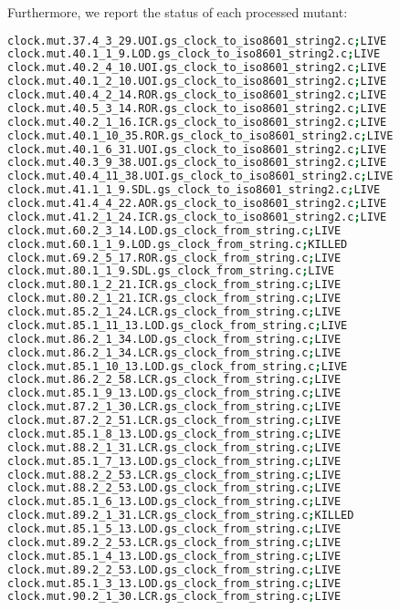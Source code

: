 
Furthermore, we report the status of each processed mutant:

\begin{lstlisting}[language=bash, label=statuses, caption=Mutants statuses.]
clock.mut.37.4_3_29.UOI.gs_clock_to_iso8601_string2.c;LIVE
clock.mut.40.1_1_9.LOD.gs_clock_to_iso8601_string2.c;LIVE
clock.mut.40.2_4_10.UOI.gs_clock_to_iso8601_string2.c;LIVE
clock.mut.40.1_2_10.UOI.gs_clock_to_iso8601_string2.c;LIVE
clock.mut.40.4_2_14.ROR.gs_clock_to_iso8601_string2.c;LIVE
clock.mut.40.5_3_14.ROR.gs_clock_to_iso8601_string2.c;LIVE
clock.mut.40.2_1_16.ICR.gs_clock_to_iso8601_string2.c;LIVE
clock.mut.40.1_10_35.ROR.gs_clock_to_iso8601_string2.c;LIVE
clock.mut.40.1_6_31.UOI.gs_clock_to_iso8601_string2.c;LIVE
clock.mut.40.3_9_38.UOI.gs_clock_to_iso8601_string2.c;LIVE
clock.mut.40.4_11_38.UOI.gs_clock_to_iso8601_string2.c;LIVE
clock.mut.41.1_1_9.SDL.gs_clock_to_iso8601_string2.c;LIVE
clock.mut.41.4_4_22.AOR.gs_clock_to_iso8601_string2.c;LIVE
clock.mut.41.2_1_24.ICR.gs_clock_to_iso8601_string2.c;LIVE
clock.mut.60.2_3_14.LOD.gs_clock_from_string.c;LIVE
clock.mut.60.1_1_9.LOD.gs_clock_from_string.c;KILLED
clock.mut.69.2_5_17.ROR.gs_clock_from_string.c;LIVE
clock.mut.80.1_1_9.SDL.gs_clock_from_string.c;LIVE
clock.mut.80.1_2_21.ICR.gs_clock_from_string.c;LIVE
clock.mut.80.2_1_21.ICR.gs_clock_from_string.c;LIVE
clock.mut.85.2_1_24.LCR.gs_clock_from_string.c;LIVE
clock.mut.85.1_11_13.LOD.gs_clock_from_string.c;LIVE
clock.mut.86.2_1_34.LOD.gs_clock_from_string.c;LIVE
clock.mut.86.2_1_34.LCR.gs_clock_from_string.c;LIVE
clock.mut.85.1_10_13.LOD.gs_clock_from_string.c;LIVE
clock.mut.86.2_2_58.LCR.gs_clock_from_string.c;LIVE
clock.mut.85.1_9_13.LOD.gs_clock_from_string.c;LIVE
clock.mut.87.2_1_30.LCR.gs_clock_from_string.c;LIVE
clock.mut.87.2_2_51.LCR.gs_clock_from_string.c;LIVE
clock.mut.85.1_8_13.LOD.gs_clock_from_string.c;LIVE
clock.mut.88.2_1_31.LCR.gs_clock_from_string.c;LIVE
clock.mut.85.1_7_13.LOD.gs_clock_from_string.c;LIVE
clock.mut.88.2_2_53.LCR.gs_clock_from_string.c;LIVE
clock.mut.88.2_2_53.LOD.gs_clock_from_string.c;LIVE
clock.mut.85.1_6_13.LOD.gs_clock_from_string.c;LIVE
clock.mut.89.2_1_31.LCR.gs_clock_from_string.c;KILLED
clock.mut.85.1_5_13.LOD.gs_clock_from_string.c;LIVE
clock.mut.89.2_2_53.LCR.gs_clock_from_string.c;LIVE
clock.mut.85.1_4_13.LOD.gs_clock_from_string.c;LIVE
clock.mut.89.2_2_53.LOD.gs_clock_from_string.c;LIVE
clock.mut.85.1_3_13.LOD.gs_clock_from_string.c;LIVE
clock.mut.90.2_1_30.LCR.gs_clock_from_string.c;LIVE

\end{lstlisting}
